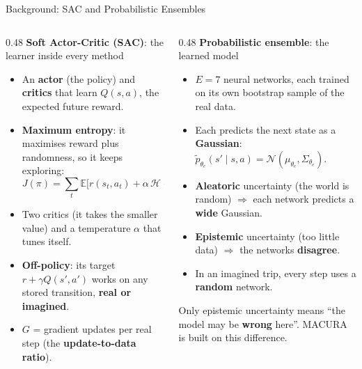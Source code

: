 \documentclass[aspectratio=169,10pt]{beamer}
\newcommand{\ptil}{\tilde{p}}
\begin{document}
\begin{frame}{Background: SAC and Probabilistic Ensembles}
  \begin{columns}[T]
    \begin{column}{0.48\textwidth}
      \textbf{Soft Actor-Critic (SAC)}: the learner inside every method
      \begin{itemize}\small
        \item An \textbf{actor} (the policy) and \textbf{critics} that learn $Q(s,a)$, the expected future reward.
        \item \textbf{Maximum entropy}: it maximises reward plus randomness, so it keeps exploring:
              \[ J(\pi)=\textstyle\sum_t \mathbb{E}\big[r(s_t,a_t)+\alpha\,\mathcal{H}(\pi(\cdot\mid s_t))\big] \]
        \item Two critics (it takes the smaller value) and a temperature $\alpha$ that tunes itself.
        \item \textbf{Off-policy}: its target $r+\gamma Q(s',a')$ works on any stored transition, \textbf{real or
              imagined}.
        \item $G$ = gradient updates per real step (the \textbf{update-to-data ratio}).
      \end{itemize}
    \end{column}
    \begin{column}{0.48\textwidth}
      \textbf{Probabilistic ensemble}: the learned model
      \begin{itemize}\small
        \item $E=7$ neural networks, each trained on its own bootstrap sample of the real data.
        \item Each predicts the next state as a \textbf{Gaussian}: $\ptil_{\theta_e}(s'\mid s,a)=\mathcal{N}(\mu_{\theta_e},\Sigma_{\theta_e})$.
        \item \textbf{Aleatoric} uncertainty (the world is random) $\Rightarrow$ each network predicts a \textbf{wide}
              Gaussian.
        \item \textbf{Epistemic} uncertainty (too little data) $\Rightarrow$ the networks \textbf{disagree}.
        \item In an imagined trip, every step uses a \textbf{random} network.
      \end{itemize}
      \vspace{0.3em}
      \colorbox{myorange!12}{\parbox{0.95\linewidth}{\small Only epistemic uncertainty means ``the model may be
      \textbf{wrong} here''. MACURA is built on this difference.}}
    \end{column}
  \end{columns}
\end{frame}
\end{document}
